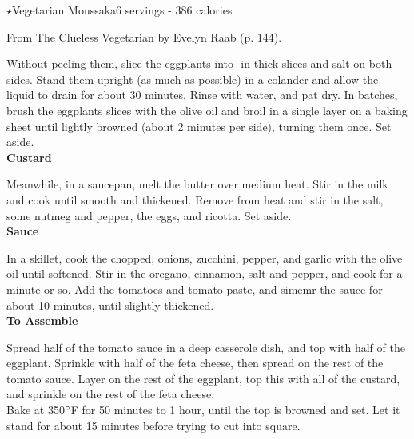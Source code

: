 \begin{recipe}{\texorpdfstring{$\star$}{str}Vegetarian Moussaka}{6 servings - 386 calories}{}

\freeform From {\normalfont The Clueless Vegetarian} by Evelyn Raab (p. 144).


Without peeling them, slice the eggplants into -in thick slices and salt on both sides. Stand them upright (as much as possible) in a colander and allow the liquid to drain for about 30 minutes. Rinse with water, and pat dry. In batches, brush the eggplants slices with the olive oil and broil in a single layer on a baking sheet until lightly browned (about 2 minutes per side), turning them once. Set aside.\\

\textbf{Custard}

Meanwhile, in a saucepan, melt the butter over medium heat. Stir in the milk and cook until smooth and thickened. Remove from heat and stir in the salt, some nutmeg and pepper, the eggs, and ricotta. Set aside.\\

\textbf{Sauce}

In a skillet, cook the chopped, onions, zucchini, pepper, and garlic with the olive oil until softened. Stir in the oregano, cinnamon, salt and pepper, and cook for a minute or so. Add the tomatoes and tomato paste, and simemr the sauce for about 10 minutes, until slightly thickened.\\

\textbf{To Assemble}

Spread half of the tomato sauce in a deep casserole dish, and top with half of the eggplant. Sprinkle with half of the feta cheese, then spread on the rest of the tomato sauce. Layer on the rest of the eggplant, top this with all of the custard, and sprinkle on the rest of the feta cheese.\\

Bake at 350$\degree$F for 50 minutes to 1 hour, until the top is browned and set. Let it stand for about 15 minutes before trying to cut into square.

\end{recipe}